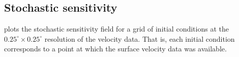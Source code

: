 

\subsection{Stochastic sensitivity}


 plots the stochastic sensitivity field for a grid of initial conditions at the \(0.25^\circ \times 0.25^\circ\) resolution of the velocity data.
That is, each initial condition corresponds to a point at which the surface velocity data was available.





